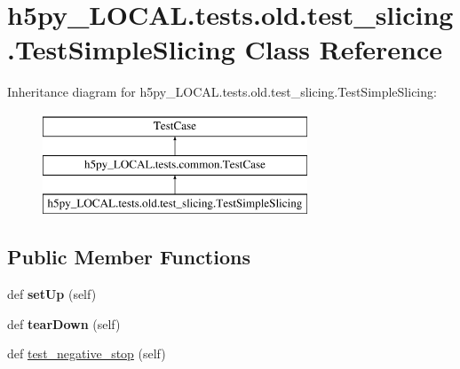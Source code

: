 \hypertarget{classh5py__LOCAL_1_1tests_1_1old_1_1test__slicing_1_1TestSimpleSlicing}{}\section{h5py\+\_\+\+L\+O\+C\+A\+L.\+tests.\+old.\+test\+\_\+slicing.\+Test\+Simple\+Slicing Class Reference}
\label{classh5py__LOCAL_1_1tests_1_1old_1_1test__slicing_1_1TestSimpleSlicing}
Inheritance diagram for h5py\+\_\+\+L\+O\+C\+A\+L.\+tests.\+old.\+test\+\_\+slicing.\+Test\+Simple\+Slicing\+:\begin{figure}[H]
\begin{center}
\leavevmode
\includegraphics[height=3.000000cm]{classh5py__LOCAL_1_1tests_1_1old_1_1test__slicing_1_1TestSimpleSlicing}
\end{center}
\end{figure}
\subsection*{Public Member Functions}
\begin{DoxyCompactItemize}
\item 
\mbox{\label{classh5py__LOCAL_1_1tests_1_1old_1_1test__slicing_1_1TestSimpleSlicing_a8e7ce6c87471bff224c8c9993200d140}} 
def {\bfseries set\+Up} (self)
\item 
\mbox{\label{classh5py__LOCAL_1_1tests_1_1old_1_1test__slicing_1_1TestSimpleSlicing_ac33d2b9303898db690368796c5cb2c7a}} 
def {\bfseries tear\+Down} (self)
\item 
def \hyperlink{classh5py__LOCAL_1_1tests_1_1old_1_1test__slicing_1_1TestSimpleSlicing_a5a079c160464243cd24c7d47b82fd8df}{test\+\_\+negative\+\_\+stop} (self)
\end{DoxyCompactItemize}
